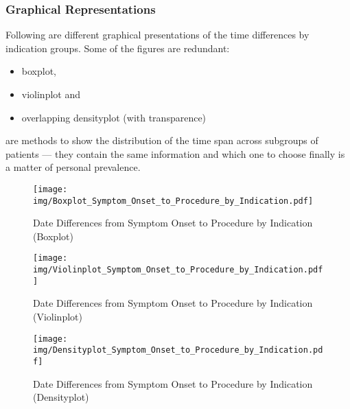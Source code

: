 \documentclass[presentation,xcolor=pdftex,dvipsnames,table,11pt]{beamer}
\begin{document}
\begin{tiny}
\subsubsection{Graphical Representations}

\begin{frame}
Following are different graphical presentations of the time differences by indication groups. Some of the figures are redundant:
\begin{itemize}
  \item{boxplot,}
  \item{violinplot and}
  \item{overlapping densityplot (with transparence)}
\end{itemize}
are methods to show the distribution of the time span across subgroups of patients --- they contain the same information and which one to choose finally is a matter of personal prevalence.
\end{frame}


\begin{frame}
\begin{figure}
  \centering
  \caption{Date Differences from Symptom Onset to Procedure by Indication (Boxplot)}
  \label{Boxplot: Date Differences from Symptom Onset to Procedure by Indication}
\texttt{[image: img/Boxplot\_Symptom\_Onset\_to\_Procedure\_by\_Indication.pdf]}\end{figure}
\end{frame}


\begin{frame}
\begin{figure}
  \centering
  \caption{Date Differences from Symptom Onset to Procedure by Indication (Violinplot)}
  \label{Violin: Date Differences from Symptom Onset to Procedure by Indication}
\texttt{[image: img/Violinplot\_Symptom\_Onset\_to\_Procedure\_by\_Indication.pdf]}\end{figure}
\end{frame}


\begin{frame}
\begin{figure}
  \centering
  \caption{Date Differences from Symptom Onset to Procedure by Indication (Densityplot)}
  \label{Density: Date Differences from Symptom Onset to Procedure by Indication}
\texttt{[image: img/Densityplot\_Symptom\_Onset\_to\_Procedure\_by\_Indication.pdf]}\end{figure}
\end{frame}




\end{tiny}
\end{document}
